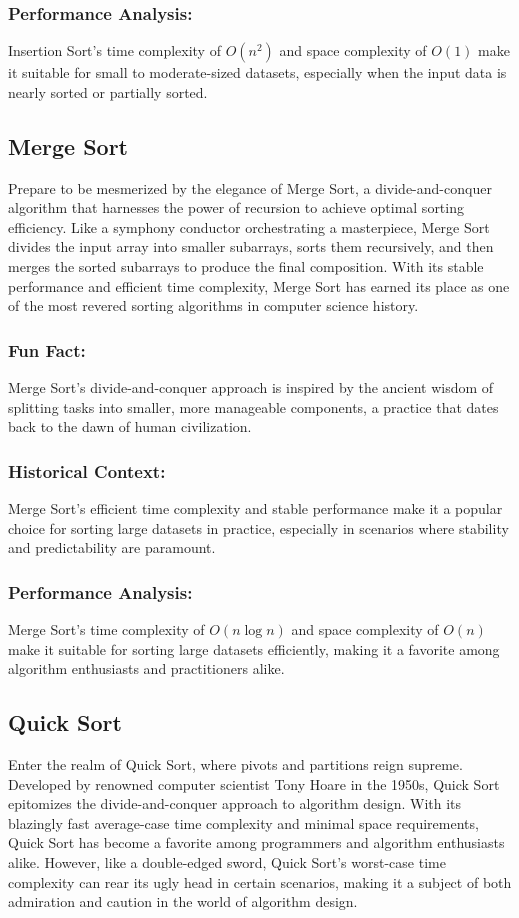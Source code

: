 \documentclass{article}
\begin{document}
\subsubsection{Performance Analysis:}
Insertion Sort's time complexity of \(O(n^2)\) and space complexity of \(O(1)\) make it suitable for small to moderate-sized datasets, especially when the input data is nearly sorted or partially sorted.

\subsection{Merge Sort}
Prepare to be mesmerized by the elegance of Merge Sort, a divide-and-conquer algorithm that harnesses the power of recursion to achieve optimal sorting efficiency. Like a symphony conductor orchestrating a masterpiece, Merge Sort divides the input array into smaller subarrays, sorts them recursively, and then merges the sorted subarrays to produce the final composition. With its stable performance and efficient time complexity, Merge Sort has earned its place as one of the most revered sorting algorithms in computer science history.

\subsubsection{Fun Fact:}
Merge Sort's divide-and-conquer approach is inspired by the ancient wisdom of splitting tasks into smaller, more manageable components, a practice that dates back to the dawn of human civilization.

\subsubsection{Historical Context:}
Merge Sort's efficient time complexity and stable performance make it a popular choice for sorting large datasets in practice, especially in scenarios where stability and predictability are paramount.

\subsubsection{Performance Analysis:}
Merge Sort's time complexity of \(O(n \log n)\) and space complexity of \(O(n)\) make it suitable for sorting large datasets efficiently, making it a favorite among algorithm enthusiasts and practitioners alike.

\subsection{Quick Sort}
Enter the realm of Quick Sort, where pivots and partitions reign supreme. Developed by renowned computer scientist Tony Hoare in the 1950s, Quick Sort epitomizes the divide-and-conquer approach to algorithm design. With its blazingly fast average-case time complexity and minimal space requirements, Quick Sort has become a favorite among programmers and algorithm enthusiasts alike. However, like a double-edged sword, Quick Sort's worst-case time complexity can rear its ugly head in certain scenarios, making it a subject of both admiration and caution in the world of algorithm design.
\end{document}
